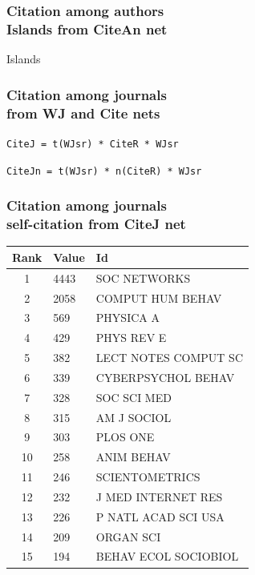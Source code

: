 \documentclass[hyperref={pdfstartview={FitBH -32768},
                         pdfpagemode=FullScreen,
                         plainpages=false,
                         colorlinks=true}
              ]{beamer}
\begin{document}
\begin{frame}[fragile]
\frametitle{Citation among authors\\ \normalsize Islands from CiteAn net}

Islands 

\end{frame}

\begin{frame}[fragile]
\frametitle{Citation among journals\\ \normalsize from WJ and Cite nets}

\texttt{CiteJ = t(WJsr) * CiteR * WJsr} \medskip 

\texttt{CiteJn = t(WJsr) * n(CiteR) * WJsr} \medskip 

\end{frame}

\begin{frame}[fragile]
\frametitle{Citation among journals\\ \normalsize self-citation from CiteJ net}

\renewcommand{\arraystretch}{0.95}
\footnotesize
\begin{center}
\begin{tabular}{c|l|l} 
 Rank       &        Value   & Id		    \\ \hline 
         1  &    4443   & SOC NETWORKS		    \\
         2  &    2058   & COMPUT HUM BEHAV	    \\
         3  &     569   & PHYSICA A		    \\
         4  &     429   & PHYS REV E		    \\
         5  &     382   & LECT NOTES COMPUT SC	    \\
         6  &     339   & CYBERPSYCHOL BEHAV	    \\
         7  &     328   & SOC SCI MED		    \\
         8  &     315   & AM J SOCIOL		    \\
         9  &     303   & PLOS ONE		    \\
        10  &     258   & ANIM BEHAV		    \\
        11  &     246   & SCIENTOMETRICS	    \\
        12  &     232   & J MED INTERNET RES	    \\
        13  &     226   & P NATL ACAD SCI USA	    \\
        14  &     209   & ORGAN SCI		    \\
        15  &     194    & BEHAV ECOL SOCIOBIOL	     \\ \hline 
\end{tabular} 
\end{center}

\end{frame}
\end{document}
